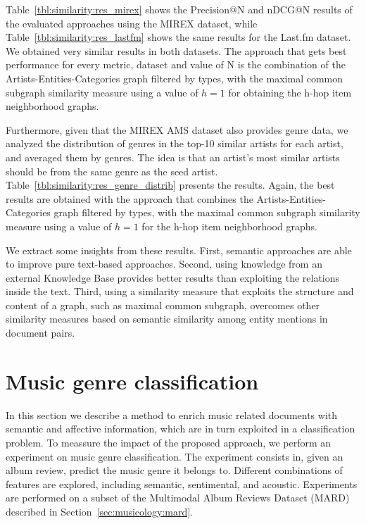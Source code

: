Table~\ref{tbl:similarity:res_mirex} shows the Precision@N and nDCG@N results of the evaluated approaches using the MIREX dataset, while Table~\ref{tbl:similarity:res_lastfm} shows the same results for the Last.fm dataset. We obtained very similar results in both datasets. The approach that gets best performance for every metric, dataset and value of N is the combination of the Artists-Entities-Categories graph filtered by types, with the maximal common subgraph similarity measure using a value of $h=1$ for obtaining the h-hop item neighborhood graphs.

Furthermore, given that the MIREX AMS dataset also provides genre data, we analyzed the distribution of genres in the top-10 similar artists for each artist, and averaged them by genres. The idea is that an artist's most similar artists should be from the same genre as the seed artist.
Table~\ref{tbl:similarity:res_genre_distrib} presents the results. Again, the best results are obtained with the approach that combines the Artists-Entities-Categories graph filtered by types, with the maximal common subgraph similarity measure using a value of $h=1$ for the h-hop item neighborhood graphs.

We extract some insights from these results. First, semantic approaches are able to improve pure text-based approaches. Second, using knowledge from an external Knowledge Base provides better results than exploiting the relations inside the text. Third, using a similarity measure that exploits the structure and content of a graph, such as maximal common subgraph, overcomes other similarity measures based on semantic similarity among entity mentions in document pairs.


\section{Music genre classification}\label{sec:similarity:classification}

In this section we describe a method to enrich music related documents with semantic and affective information, which are in turn exploited in a classification problem. To meassure the impact of the proposed approach, we perform an experiment on music genre classification. The experiment consists in, given an album review, predict the music genre it belongs to. Different combinations of features are explored, including semantic, sentimental, and acoustic. Experiments are performed on a subset of the Multimodal Album Reviews Dataset (MARD) described in Section~\ref{sec:musicology:mard}.


